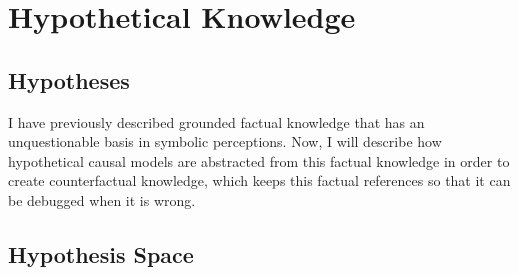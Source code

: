 \chapter{Hypothetical Knowledge}
\label{chapter:hypothetical_knowledge}

\section{Hypotheses}

I have previously described grounded factual knowledge that has an
unquestionable basis in symbolic perceptions.  Now, I will describe
how hypothetical causal models are abstracted from this factual
knowledge in order to create counterfactual knowledge, which keeps
this factual references so that it can be debugged when it is wrong.

\section{Hypothesis Space}

